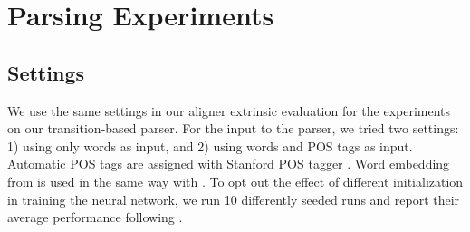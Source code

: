 \documentclass[11pt,a4paper]{article}
\begin{document}
\section{Parsing Experiments}\label{sec:parse-exp}

\subsection{Settings}
We use the same settings in our aligner extrinsic evaluation
for the experiments on our transition-based parser.
For the input to the parser, we tried two settings: 1) using only words as input,
and 2) using words and POS tags as input.
Automatic POS tags are assigned with Stanford POS tagger \cite{manning-EtAl:2014:P14-5}.
Word embedding from \citet{ling-EtAl:2015:NAACL-HLT} is used
in the same way with \citet{ballesteros-alonaizan:2017:EMNLP2017}.
To opt out the effect of different initialization in training the neural network,
we run 10 differently seeded runs and report their average performance following \citet{reimers-gurevych:2017:EMNLP2017}.
\end{document}
